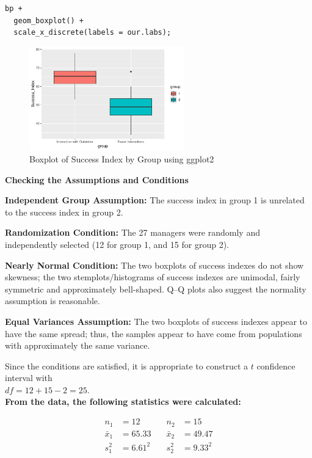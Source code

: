 \begin{example}
\begin{tcolorbox}[colback=gray!10, colframe=black!45, arc=2mm,
  before skip=4pt, after skip=4pt]
\begin{verbatim}
bp +
  geom_boxplot() +
  scale_x_discrete(labels = our.labs);
\end{verbatim}
\end{tcolorbox}
\begin{figure}[H]
\centering
\includegraphics[width=0.6\textwidth]{section14/images/boxplot_ggplot2.pdf}
\caption{Boxplot of Success Index by Group using ggplot2}
\label{fig:boxplot-ggplot}
\end{figure}
\noindent\textbf{Checking the Assumptions and Conditions}

\vspace{0.5em}

\noindent\textbf{Independent Group Assumption:} The success index in group 1 is unrelated to the success index in group 2.

\noindent\textbf{Randomization Condition:} The 27 managers were randomly and independently selected (12 for group 1, and 15 for group 2).

\noindent\textbf{Nearly Normal Condition:} The two boxplots of success indexes do not show skewness; the two stemplots/histograms of success indexes are unimodal, fairly symmetric and approximately bell-shaped. Q–Q plots also suggest the normality assumption is reasonable.

\noindent\textbf{Equal Variances Assumption:} The two boxplots of success indexes appear to have the same spread; thus, the samples appear to have come from populations with approximately the same variance.

\vspace{0.5em}

Since the conditions are satisfied, it is appropriate to construct a $t$ confidence interval with\\
$df = 12 + 15 - 2 = 25$. \\

\noindent\textbf{From the data, the following statistics were calculated:}

\[
\begin{aligned}
n_1 &= 12 &\quad n_2 &= 15 \\
\bar{x}_1 &= 65.33 &\quad \bar{x}_2 &= 49.47 \\
s_1^2 &= 6.61^2 &\quad s_2^2 &= 9.33^2
\end{aligned}
\]


\end{example}

